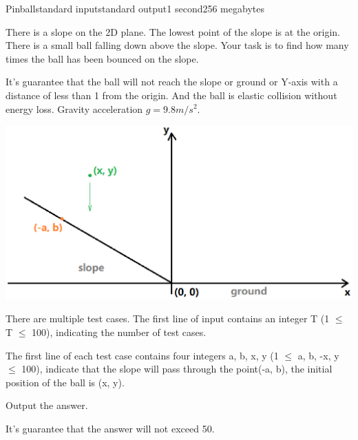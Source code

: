 \begin{problem}{Pinball}{standard input}{standard output}{1 second}{256 megabytes}

There is a slope on the 2D plane. The lowest point of the slope is at the origin. There is a small ball falling down above the slope. Your task is to find how many times the ball has been bounced on the slope.

It's guarantee that the ball will not reach the slope or ground or Y-axis with a distance of less than 1 from the origin. And the ball is elastic collision without energy loss. Gravity acceleration $g = 9.8 m/s^2$.

\centerline{\includegraphics[scale=0.45]{pinball.eps}}

\InputFile
There are multiple test cases. The first line of input contains an integer T (1 $\le$ T $\le$ 100), indicating the number of test cases.

The first line of each test case contains four integers a, b, x, y (1 $\le$ a, b, -x, y $\le$ 100), indicate that the slope will pass through the point(-a, b), the initial position of the ball is (x, y).

\OutputFile
Output the answer.

It's guarantee that the answer will not exceed 50.

\Example

\begin{example}
%
\end{example}

\end{problem}

